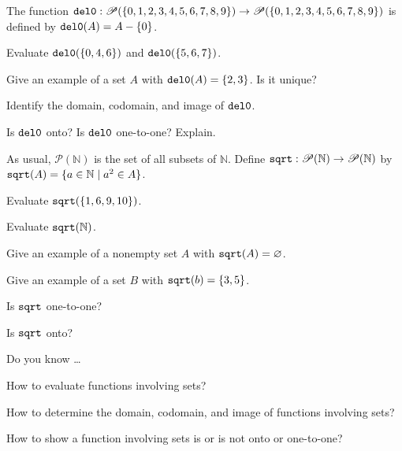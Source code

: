 \begin{exer}[\exerU] %
\label{exer_set_without_zero}
    The function $\texttt{del0}:\mathscr{P}(\{0,1,2,3,4,5,6,7,8,9\}) \to \mathscr{P}(\{0,1,2,3,4,5,6,7,8,9\})$ is defined by $\texttt{del0}(A)=A -\{0\}$.
        \begin{exerpart}
            \item Evaluate $\texttt{del0}(\{0,4,6\})$ and $\texttt{del0}(\{5,6,7\})$.
            \item Give an example of a set $A$ with $\texttt{del0}(A) = \{2,3\}$.  Is it unique?
            \item Identify the domain, codomain, and image of $\texttt{del0}$.
            \item Is $\texttt{del0}$ onto? Is $\texttt{del0}$ one-to-one? Explain.
        \end{exerpart}  
\end{exer}

\begin{exer}[\exerU] %
\label{exer_sqrt_set}
    As usual, $\mathscr{P}(\mathbb{N})$ is the set of all subsets of $\mathbb{N}$.  Define $\texttt{sqrt}: \mathscr{P}(\mathbb{N}) \to \mathscr{P}(\mathbb{N})$ by $\texttt{sqrt}(A) = \{a \in \mathbb{N} \mid a^2 \in A\}$.
        \begin{exerpart}
            \item Evaluate $\texttt{sqrt}(\{1,6,9,10\})$.
            \item Evaluate $\texttt{sqrt}(\mathbb{N})$.
            \item Give an example of a nonempty set $A$ with $\texttt{sqrt}(A) = \varnothing$.
            \item Give an example of a set $B$ with $\texttt{sqrt}(b) = \{3,5\}$.
            \item Is $\texttt{sqrt}$ one-to-one?
            \item Is $\texttt{sqrt}$ onto?
        \end{exerpart}
\end{exer}

\begin{exer}[\exerR] %
\label{exer_dyk_set_fns}
    Do you know \ldots
        \begin{exerpart}
            \item How to evaluate functions involving sets?
            \item How to determine the domain, codomain, and image of functions involving sets?
            \item How to show a function involving sets is or is not onto or one-to-one?
        \end{exerpart}
\end{exer}

